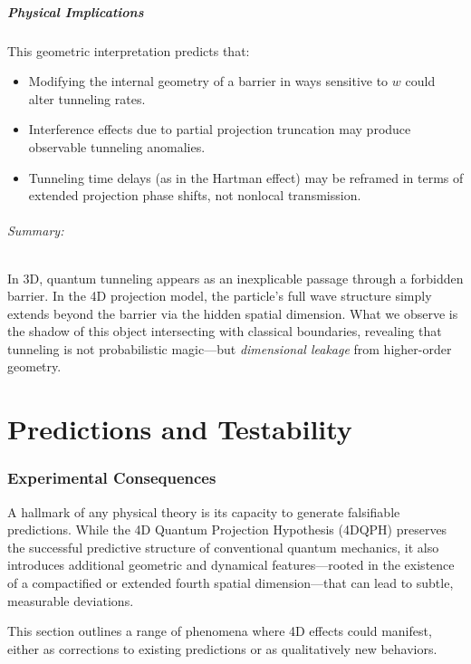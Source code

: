 \documentclass[12pt]{article}
\begin{document}
\subsubsection{Physical Implications}

This geometric interpretation predicts that:
\begin{itemize}
  \item Modifying the internal geometry of a barrier in ways sensitive to \( w \) could alter tunneling rates.
  \item Interference effects due to partial projection truncation may produce observable tunneling anomalies.
  \item Tunneling time delays (as in the Hartman effect) may be reframed in terms of extended projection phase shifts, not nonlocal transmission.
\end{itemize}

\paragraph{Summary:}
In 3D, quantum tunneling appears as an inexplicable passage through a forbidden barrier. In the 4D projection model, the particle’s full wave structure simply extends beyond the barrier via the hidden spatial dimension. What we observe is the shadow of this object intersecting with classical boundaries, revealing that tunneling is not probabilistic magic—but \emph{dimensional leakage} from higher-order geometry.

\newpage

\part{Predictions and Testability}

\section{Experimental Consequences}

A hallmark of any physical theory is its capacity to generate falsifiable predictions. While the 4D Quantum Projection Hypothesis (4DQPH) preserves the successful predictive structure of conventional quantum mechanics, it also introduces additional geometric and dynamical features—rooted in the existence of a compactified or extended fourth spatial dimension—that can lead to subtle, measurable deviations.

This section outlines a range of phenomena where 4D effects could manifest, either as corrections to existing predictions or as qualitatively new behaviors.
\end{document}
